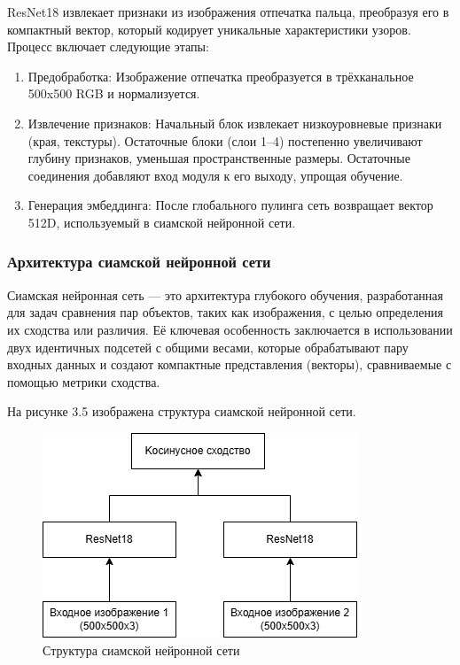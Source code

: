 ResNet18 извлекает признаки из изображения отпечатка пальца, преобразуя его в компактный вектор, который кодирует уникальные характеристики узоров. Процесс включает следующие этапы:

\begin{enumerate}
	\item Предобработка: Изображение отпечатка преобразуется в трёхканальное 500x500 RGB и нормализуется.
	\item Извлечение признаков: Начальный блок извлекает низкоуровневые признаки (края, текстуры). Остаточные блоки (слои 1–4) постепенно увеличивают глубину признаков, уменьшая пространственные размеры. Остаточные соединения добавляют вход модуля к его выходу, упрощая обучение.
	\item Генерация эмбеддинга: После глобального пулинга сеть возвращает вектор 512D, используемый в сиамской нейронной сети.
\end{enumerate}

\subsubsection{Архитектура сиамской нейронной сети}
               
Сиамская нейронная сеть — это архитектура глубокого обучения, разработанная для задач сравнения пар объектов, таких как изображения, с целью определения их сходства или различия. Её ключевая особенность заключается в использовании двух идентичных подсетей с общими весами, которые обрабатывают пару входных данных и создают компактные представления (векторы), сравниваемые с помощью метрики сходства.

На рисунке 3.5 изображена структура сиамской нейронной сети.

\begin{figure}[H]
	\centering
	\includegraphics[width=0.6\linewidth]{images/cosine}
	\caption{Структура сиамской нейронной сети}
	\label{fig:cosine}
\end{figure}

